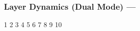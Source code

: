 \subsubsection[Layer Dynamics (Dual)]{Layer Dynamics (Dual Mode) --- \UiKey{\SET}}










































1
2
3
4
5
6
7
8
9
10
